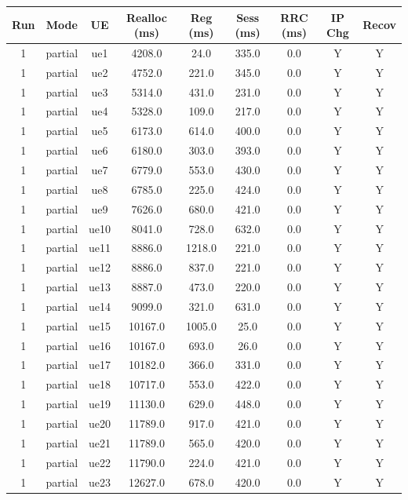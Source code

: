 \begin{table}[ht]
\centering
\begin{tabular}{|c|c|c|c|c|c|c|c|c|}
\hline
Run & Mode & UE & Realloc (ms) & Reg (ms) & Sess (ms) & RRC (ms) & IP Chg & Recov \\
\hline
1 & partial & ue1 & 4208.0 & 24.0 & 335.0 & 0.0 & Y & Y \\
1 & partial & ue2 & 4752.0 & 221.0 & 345.0 & 0.0 & Y & Y \\
1 & partial & ue3 & 5314.0 & 431.0 & 231.0 & 0.0 & Y & Y \\
1 & partial & ue4 & 5328.0 & 109.0 & 217.0 & 0.0 & Y & Y \\
1 & partial & ue5 & 6173.0 & 614.0 & 400.0 & 0.0 & Y & Y \\
1 & partial & ue6 & 6180.0 & 303.0 & 393.0 & 0.0 & Y & Y \\
1 & partial & ue7 & 6779.0 & 553.0 & 430.0 & 0.0 & Y & Y \\
1 & partial & ue8 & 6785.0 & 225.0 & 424.0 & 0.0 & Y & Y \\
1 & partial & ue9 & 7626.0 & 680.0 & 421.0 & 0.0 & Y & Y \\
1 & partial & ue10 & 8041.0 & 728.0 & 632.0 & 0.0 & Y & Y \\
1 & partial & ue11 & 8886.0 & 1218.0 & 221.0 & 0.0 & Y & Y \\
1 & partial & ue12 & 8886.0 & 837.0 & 221.0 & 0.0 & Y & Y \\
1 & partial & ue13 & 8887.0 & 473.0 & 220.0 & 0.0 & Y & Y \\
1 & partial & ue14 & 9099.0 & 321.0 & 631.0 & 0.0 & Y & Y \\
1 & partial & ue15 & 10167.0 & 1005.0 & 25.0 & 0.0 & Y & Y \\
1 & partial & ue16 & 10167.0 & 693.0 & 26.0 & 0.0 & Y & Y \\
1 & partial & ue17 & 10182.0 & 366.0 & 331.0 & 0.0 & Y & Y \\
1 & partial & ue18 & 10717.0 & 553.0 & 422.0 & 0.0 & Y & Y \\
1 & partial & ue19 & 11130.0 & 629.0 & 448.0 & 0.0 & Y & Y \\
1 & partial & ue20 & 11789.0 & 917.0 & 421.0 & 0.0 & Y & Y \\
1 & partial & ue21 & 11789.0 & 565.0 & 420.0 & 0.0 & Y & Y \\
1 & partial & ue22 & 11790.0 & 224.0 & 421.0 & 0.0 & Y & Y \\
1 & partial & ue23 & 12627.0 & 678.0 & 420.0 & 0.0 & Y & Y \\

\end{tabular}
\end{table}
